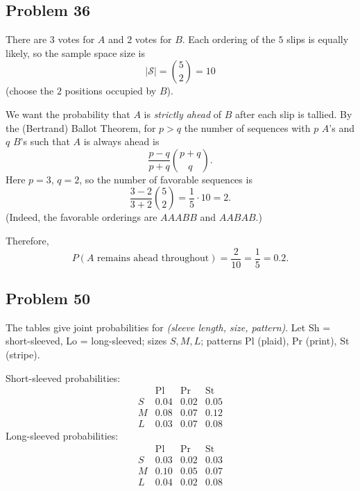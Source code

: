 \documentclass{article}
\begin{document}
\subsection*{Problem 36}

There are $3$ votes for $A$ and $2$ votes for $B$. Each ordering of the $5$ slips is equally likely, so the
sample space size is
\[
|\mathcal S|=\binom{5}{2}=10
\]
(choose the $2$ positions occupied by $B$).

We want the probability that $A$ is \emph{strictly ahead} of $B$ after each slip is tallied.
By the (Bertrand) Ballot Theorem, for $p>q$ the number of sequences with $p$ $A$'s and $q$ $B$'s such that $A$
is always ahead is
\[
\frac{p-q}{p+q}\binom{p+q}{q}.
\]
Here $p=3$, $q=2$, so the number of favorable sequences is
\[
\frac{3-2}{3+2}\binom{5}{2}=\frac{1}{5}\cdot 10 = 2.
\]
(Indeed, the favorable orderings are $AAABB$ and $AABAB$.)

Therefore,
\[
P(\text{$A$ remains ahead throughout})=\frac{2}{10}=\frac{1}{5}=0.2.
\]


\subsection*{Problem 50}

The tables give joint probabilities for \emph{(sleeve length, size, pattern)}. Let Sh = short-sleeved, Lo =
long-sleeved; sizes $S,M,L$; patterns Pl (plaid), Pr (print), St (stripe).

Short-sleeved probabilities:
\[
\begin{array}{c|ccc}
 & \text{Pl} & \text{Pr} & \text{St}\\ \hline
S & 0.04 & 0.02 & 0.05\\
M & 0.08 & 0.07 & 0.12\\
L & 0.03 & 0.07 & 0.08
\end{array}
\]
Long-sleeved probabilities:
\[
\begin{array}{c|ccc}
 & \text{Pl} & \text{Pr} & \text{St}\\ \hline
S & 0.03 & 0.02 & 0.03\\
M & 0.10 & 0.05 & 0.07\\
L & 0.04 & 0.02 & 0.08
\end{array}
\]
\end{document}
